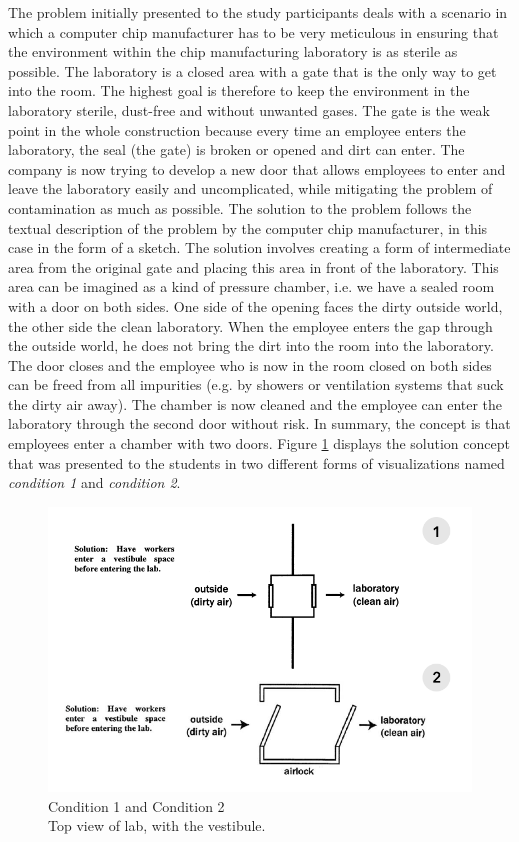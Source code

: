 \documentclass[12pt]{article}
\begin{document}
The problem initially presented to the study participants deals with a scenario in which a computer chip manufacturer has to be very meticulous in ensuring that the environment within the chip manufacturing laboratory is as sterile as possible. The laboratory is a closed area with a gate that is the only way to get into the room. The highest goal is therefore to keep the environment in the laboratory sterile, dust-free and without unwanted gases. The gate is the weak point in the whole construction because every time an employee enters the laboratory, the seal (the gate) is broken or opened and dirt can enter. The company is now trying to develop a new door that allows employees to enter and leave the laboratory easily and uncomplicated, while mitigating the problem of contamination as much as possible. The solution to the problem follows the textual description of the problem by the computer chip manufacturer, in this case in the form of a sketch. The solution involves creating a form of intermediate area from the original gate and placing this area in front of the laboratory. This area can be imagined as a kind of pressure chamber, i.e. we have a sealed room with a door on both sides. One side of the opening faces the dirty outside world, the other side the clean laboratory. When the employee enters the gap through the outside world, he does not bring the dirt into the room into the laboratory. The door closes and the employee who is now in the room closed on both sides can be freed from all impurities (e.g. by showers or ventilation systems that suck the dirty air away). The chamber is now cleaned and the employee can enter the laboratory through the second door without risk. In summary, the concept is that employees enter a chamber with two doors. Figure \ref{fig:input_conditions} displays the solution concept that was presented to the students in two different forms of visualizations named \textit{condition 1} and \textit{condition 2}.

\begin{figure}[H]
  \centering
  \includegraphics[width=0.7\linewidth]{images/input_conditons.PNG}
  \caption{\label{fig:input_conditions} Condition 1 and Condition 2 \\ Top view of lab, with the vestibule.}
\end{figure}     
\end{document}
